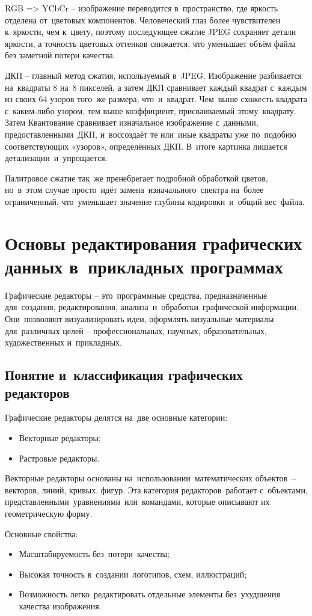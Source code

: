 \documentclass{ou}
\begin{document}
RGB => YCbCr -- изображение переводится в~пространство, где яркость отделена от~цветовых компонентов. Человеческий глаз более чувствителен к~яркости, чем к~цвету, поэтому последующее сжатие JPEG сохраняет детали яркости, а точность цветовых оттенков снижается, что уменьшает объём файла без заметной потери качества.

ДКП -- главный метод сжатия, используемый в~JPEG. Изображение разбивается на~квадраты 8 на~8 пикселей, а затем ДКП сравнивает каждый квадрат с~каждым из своих 64 узоров того~же размера, что~и~квадрат. Чем~выше схожесть квадрата с~каким-либо узором, тем выше коэффициент, присваиваемый этому~квадрату. Затем Квантование сравнивает изначальное изображение с~данными, предоставленными~ДКП, и~воссоздаёт те или~иные квадраты уже по~подобию соответствующих «узоров», определённых ДКП. В~итоге картинка лишается детализации~и~упрощается.

Палитровое сжатие так~же пренебрегает подробной обработкой цветов, но~в~этом случае просто~идёт замена~изначального~спектра на~более ограниченный, что~уменьшает значение глубины кодировки~и~общий вес~файла.
\newpage
\section{Основы редактирования графических данных в~прикладных программах}
Графические редакторы -- это~программные средства, предназначенные для~создания, редактирования, анализа~и~обработки~графической информации. Они~позволяют визуализировать идеи, оформлять визуальные материалы для~различных целей -- профессиональных, научных, образовательных, художественных и~прикладных. 
\subsection{Понятие и~классификация графических редакторов}
Графические редакторы делятся на~две основные категории:
\begin{itemize}[label=-, leftmargin=0em, itemindent=3.35em, nosep]
  \item Векторные редакторы;
  \item Растровые редакторы.
\end{itemize}

Векторные редакторы основаны на~использовании~математических объектов~-- векторов, линий, кривых, фигур. Эта категория редакторов~работает с~объектами, представленными~уравнениями~или~командами, которые описывают их геометрическую форму. 

Основные свойства:
\begin{itemize}[label=-, leftmargin=0em, itemindent=3.35em, nosep]
  \item Масштабируемость без~потери~качества;
  \item Высокая точность в~создании~логотипов, схем, иллюстраций;
  \item Возможность легко~редактировать отдельные элементы без~ухудшения качества изображения.
\end{itemize}
\end{document}
